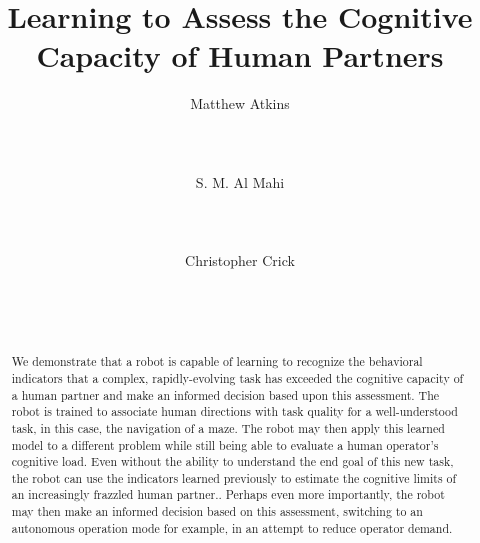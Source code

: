 \documentclass{sig-alternate}
\begin{document}
\title{Learning to Assess the Cognitive Capacity of Human Partners}


\author{
%
\alignauthor
Matthew Atkins\\
       \\
       \\
       \\
\alignauthor
S. M. Al Mahi\\
       \\
       \\
       \\
\alignauthor Christopher Crick\\
       \\
       \\
       \\
}

\maketitle
\begin{abstract} 
We demonstrate that a robot is capable of learning to recognize the
behavioral indicators that a complex, rapidly-evolving task has exceeded
the cognitive capacity of a human partner and make an informed decision
based upon this assessment. The robot is trained to associate human
directions with task quality for a well-understood task, in this case, the
navigation of a maze. The robot may then apply this learned model to a
different problem while still being able to evaluate a human operator's
cognitive load. Even without the ability to understand the end goal of this
new task, the robot can use the indicators learned previously to estimate
the cognitive limits of an increasingly frazzled human partner.. Perhaps
even more importantly, the robot may then make an informed decision
based on this assessment, switching to an autonomous operation mode for
example, in an attempt to reduce operator demand.
\end{abstract}

\end{document}
